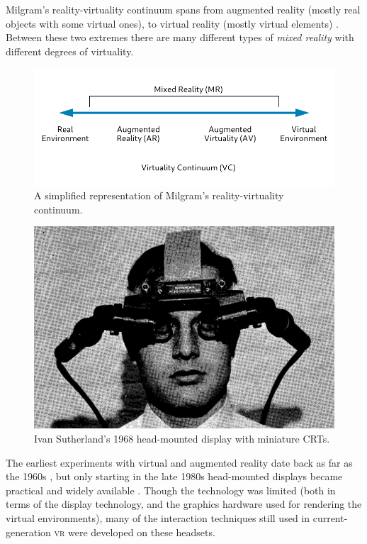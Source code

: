 \documentclass[nobib]{tufte-book} %
\begin{document}
Milgram's reality-virtuality continuum spans from augmented reality (mostly real objects with some virtual ones), to virtual reality (mostly virtual elements) \cite{milgram1994taxonomy}. Between these two extremes there are many different types of \emph{mixed reality} with different degrees of virtuality.

\begin{figure}
  \includegraphics{milgram.pdf}
  \caption{A simplified representation of Milgram's reality-virtuality continuum.}
  \label{fig:milgram}
\end{figure}

\begin{figure}
  \includegraphics{sutherland-hmd.png}
  \caption{Ivan Sutherland's 1968 head-mounted display with miniature CRTs.}
  \label{fig:sutherland}
\end{figure}

\newpage

The earliest experiments with virtual and augmented reality date back as far as the 1960s \cite{sutherland1968head}, but only starting in the late 1980s head-mounted displays became practical and widely available \cite{billinghurst2015survey}. Though the technology was limited (both in terms of the display technology, and the graphics hardware used for rendering the virtual environments), many of the interaction techniques still used in current-generation \textsc{vr} were developed on these headsets.
\end{document}
